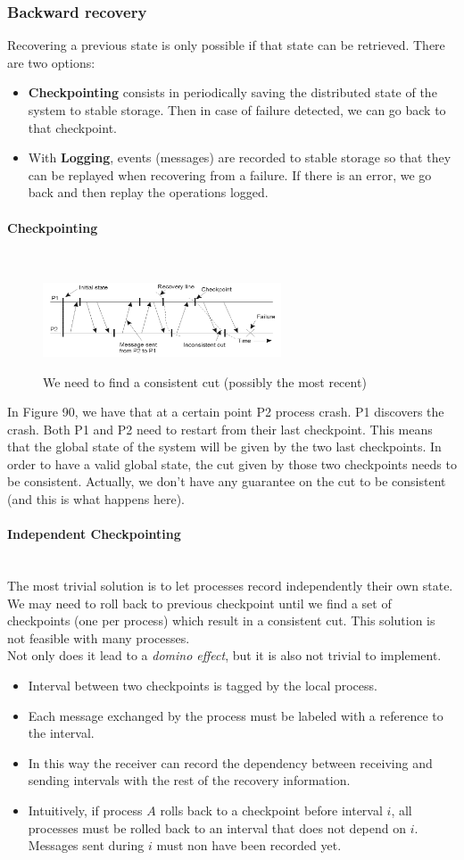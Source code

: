 \documentclass[10pt,a4paper]{article}
\newcommand{\myparagraph}[1]{\paragraph{#1}\mbox{}\\[0.05in]}
\begin{document}
\subsubsection{Backward recovery}
Recovering a previous state is only possible if that state can be retrieved. There are two options:
\begin{itemize}
	\item \textbf{Checkpointing} consists in periodically saving the distributed state of the system to stable storage. Then in case of failure detected, we can go back to that checkpoint.
	\item With \textbf{Logging}, events (messages) are recorded to stable storage so that they can be replayed when recovering from a failure. If there is an error, we go back and then replay the operations logged.
\end{itemize}
\myparagraph{Checkpointing}
\begin{figure}[h!]
\hfill \includegraphics[width=200pt]{images/checkpoint-recovery.png}\hspace*{\fill}
  \label{fig:checkpoint-recovery}
  \caption{We need to find a consistent cut (possibly the most recent)}
\end{figure}
In Figure 90, we have that at a certain point P2 process crash. P1 discovers the crash. Both P1 and P2 need to restart from their last checkpoint. This means that the global state of the system will be given by the two last checkpoints. In order to have a valid global state, the cut given by those two checkpoints needs to be consistent. Actually, we don't have any guarantee on the cut to be consistent (and this is what happens here). \pagebreak \\
\myparagraph{Independent Checkpointing}
The most trivial solution is to let processes record independently their own state. We may need to roll back to previous checkpoint until we find a set of checkpoints (one per process) which result in a consistent cut. This solution is not feasible with many processes. \\
Not only does it lead to a \textit{domino effect}, but it is also not trivial to implement. 
\begin{itemize}
	\item Interval between two checkpoints is tagged by the local process.
	\item Each message exchanged by the process must be labeled with a reference to the interval.
	\item In this way the receiver can record the dependency between receiving and sending intervals with the rest of the recovery information.
	\item Intuitively, if process $A$ rolls back to a checkpoint before interval $i$, all processes must be rolled back to an interval that does not depend on $i$. Messages sent during $i$ must non have been recorded yet.
\end{itemize}
\end{document}
